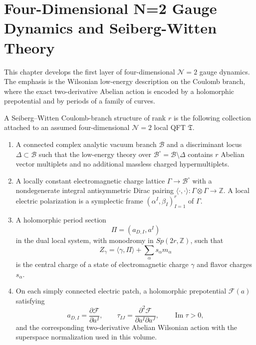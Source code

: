 \chapter{Four-Dimensional N=2 Gauge Dynamics and Seiberg-Witten Theory}
\label{ch:susy-four-dimensional-n2-seiberg-witten}

\ConventionsLorentzian

This chapter develops the first layer of four-dimensional \(\mathcal N=2\)
gauge dynamics.  The emphasis is the Wilsonian low-energy description on the
Coulomb branch, where the exact two-derivative Abelian action is encoded by a
holomorphic prepotential and by periods of a family of curves.

\begin{hypothesis}
\label{hyp:seiberg-witten-coulomb-branch-datum}
A Seiberg--Witten Coulomb-branch structure of rank \(r\) is the following
collection attached to an assumed four-dimensional \(\mathcal N=2\) local
QFT \(\mathfrak T\).
\begin{enumerate}[label=\textnormal{(\roman*)}]
\item A connected complex analytic vacuum branch
  \(\mathcal B\) and a discriminant locus
  \(\Delta\subset\mathcal B\) such that the low-energy theory over
  \(\mathcal B^\circ=\mathcal B\setminus\Delta\) contains \(r\) Abelian
  vector multiplets and no additional massless charged hypermultiplets.
\item A locally constant electromagnetic charge lattice
  \(\Gamma\to\mathcal B^\circ\) with a nondegenerate integral
  antisymmetric Dirac pairing
  \(\langle\cdot,\cdot\rangle:\Gamma\otimes\Gamma\to\mathbb Z\).  A local electric
  polarization is a symplectic frame
  \((\alpha^I,\beta_I)_{I=1}^r\) of \(\Gamma\).
\item A holomorphic period section
  \[
    \Pi=(a_{D,I},a^I)
  \]
  in the dual local system, with monodromy in
  \(Sp(2r,\mathbb Z)\), such that
  \[
    Z_\gamma=\langle\gamma,\Pi\rangle+\sum_\alpha s_\alpha m_\alpha
  \]
  is the central charge of a state of electromagnetic charge
  \(\gamma\) and flavor charges \(s_\alpha\).
\item On each simply connected electric patch, a holomorphic prepotential
  \(\mathcal F(a)\) satisfying
  \[
    a_{D,I}=\frac{\partial\mathcal F}{\partial a^I},\qquad
    \tau_{IJ}=\frac{\partial^2\mathcal F}
      {\partial a^I\partial a^J},\qquad
    \operatorname{Im}\tau>0 ,
  \]
  and the corresponding two-derivative Abelian Wilsonian action with the
  superspace normalization used in this volume.

\end{enumerate}
\end{hypothesis}
